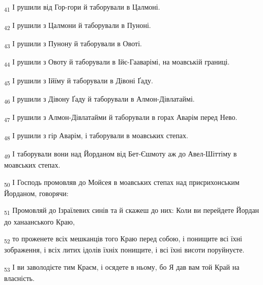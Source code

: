 \begin{tcolorbox}
\textsubscript{41} І рушили від Гор-гори й таборували в Цалмоні.
\end{tcolorbox}
\begin{tcolorbox}
\textsubscript{42} І рушили з Цалмони й таборували в Пуноні.
\end{tcolorbox}
\begin{tcolorbox}
\textsubscript{43} І рушили з Пунону й таборували в Овоті.
\end{tcolorbox}
\begin{tcolorbox}
\textsubscript{44} І рушили з Овоту й таборували в Ійє-Гааварімі, на моавській границі.
\end{tcolorbox}
\begin{tcolorbox}
\textsubscript{45} І рушили з Ійїму й таборували в Дівоні Ґаду.
\end{tcolorbox}
\begin{tcolorbox}
\textsubscript{46} І рушили з Дівону Ґаду й таборували в Алмон-Дівлатаймі.
\end{tcolorbox}
\begin{tcolorbox}
\textsubscript{47} І рушили з Алмон-Дівлатайми й таборували в горах Аварім перед Нево.
\end{tcolorbox}
\begin{tcolorbox}
\textsubscript{48} І рушили з гір Аварім, і таборували в моавських степах.
\end{tcolorbox}
\begin{tcolorbox}
\textsubscript{49} І таборували вони над Йорданом від Бет-Єшмоту аж до Авел-Шіттіму в моавських степах.
\end{tcolorbox}
\begin{tcolorbox}
\textsubscript{50} І Господь промовляв до Мойсея в моавських степах над приєрихонським Йорданом, говорячи:
\end{tcolorbox}
\begin{tcolorbox}
\textsubscript{51} Промовляй до Ізраїлевих синів та й скажеш до них: Коли ви перейдете Йордан до ханаанського Краю,
\end{tcolorbox}
\begin{tcolorbox}
\textsubscript{52} то проженете всіх мешканців того Краю перед собою, і понищите всі їхні зображення, і всіх литих ідолів їхніх понищите, і всі їхні висоти поруйнуєте.
\end{tcolorbox}
\begin{tcolorbox}
\textsubscript{53} І ви заволодієте тим Краєм, і осядете в ньому, бо Я дав вам той Край на власність.
\end{tcolorbox}
